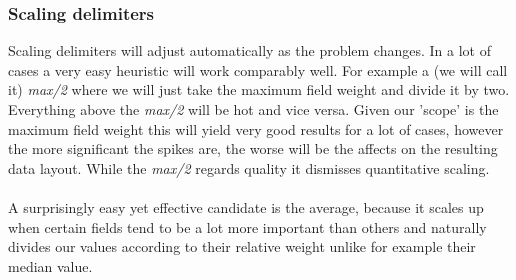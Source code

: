 \subsubsection{Scaling delimiters}
Scaling delimiters will adjust automatically as the problem changes. In a lot of cases a very easy heuristic will work comparably well. For example a (we will call it) \textit{max/2} where we will just take the maximum field weight and divide it by two. Everything above the \textit{max/2} will be hot and vice versa. Given our 'scope' is the maximum field weight this will yield very good results for a lot of cases, however the more significant the spikes are, the worse will be the affects on the resulting data layout. While the \textit{max/2} regards quality it dismisses quantitative scaling.\\\\
A surprisingly easy yet effective candidate is the average, because it scales up when certain fields tend to be a lot more important than others and naturally divides our values according to their relative weight  unlike for example their median value.
